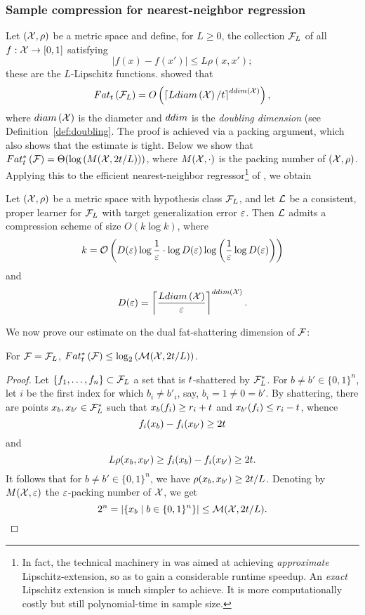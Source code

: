 \documentclass[12pt,a4paper,oneside,onecolumn]{book}
\begin{document}
\subsubsection{Sample compression for nearest-neighbor regression}
\label{sec:NN}
Let $(\mathcal{X},\rho)$ be a metric space
and define, for $L\ge0$, the collection $\mathcal{F}_L$ of all $f:\mathcal{X}\to[0,1]$ satisfying
$$ |f(x)-f(x')|\le L\rho(x,x');$$
these are the $L$-Lipschitz functions.
\citet{GottliebKK17_IEEE} showed that
\begin{eqnarray*}
Fat_{t}\left(\mathcal{F}_L\right) = O\left(  \left\lceil Ldiam\left(\mathcal{X}\right)/t\right\rceil^{ddim(\mathcal{X})} \right),
\end{eqnarray*}
where $diam\left(\mathcal{X}\right)$ is the diameter and $ddim$ is the {\em doubling dimension} (see Definition~\ref{def:doubling}.
The proof is achieved via a packing argument, which also shows that the estimate is tight.
Below we show that
$  Fat^*_{t}\left(\mathcal{F}\right) =
\Theta(\log\left({M}(\mathcal{X},2t/L)\right))$,
where $M(\mathcal{X},\cdot)$ is the packing number of $(\mathcal{X},\rho)$.
Applying this to the efficient
nearest-neighbor regressor\footnote{
  In fact, the technical machinery in
  \citet{DBLP:journals/tit/GottliebKK17}
  was aimed at achieving {\em approximate} Lipschitz-extension,
  so as to gain a considerable runtime speedup. An {\em exact} Lipschitz extension
  is much simpler to achieve. It is more computationally costly but still polynomial-time in sample size.
  }
of
\citet{DBLP:journals/tit/GottliebKK17},
we obtain
\begin{corollary}
  Let $(\mathcal{X},\rho)$ be a metric space with hypothesis class $\mathcal{F}_L$,
  and let $\mathcal{L}$ be a consistent, proper learner for $\mathcal{F}_L$ with target generalization error $\varepsilon$.
Then $\mathcal{L}$ admits a compression scheme of size $O(k\log k)$, where
  \[k = \mathcal{O}\left( D(\varepsilon) \log \frac{1}{\varepsilon} \cdot \log D(\varepsilon)
      \log \left(\frac{1}{\varepsilon} \log D(\varepsilon) \right) \right)\]
and
\[D(\varepsilon) = \left\lceil\frac{Ldiam\left(\mathcal{X}\right)}{\varepsilon}\right\rceil^{ddim(\mathcal{X})}.\]
\end{corollary}


We now prove our estimate on the dual fat-shattering dimension of $\mathcal{F}$:
\begin{lemma}
  For $\mathcal{F}=\mathcal{F}_L$,
  $Fat^*_{t}\left(\mathcal{F}\right)
  \leq \log_2\left(\mathcal{M}(\mathcal{X},2t/L)\right)$.
\end{lemma}
\begin{proof}
  Let $\left\{ f_1,\ldots,f_n \right\}\subset \mathcal{F}_L$ a set that is $t$-shattered by $\mathcal{F}^*_L$.
  For $b \neq b' \in \{0,1\}^n$,
  let $i$ be the first index
  for which $b_i \neq b'_i$,
  say, $b_i = 1\neq0= b'$.
  By shattering,
  there are points $x_b,x_{b'} \in \mathcal{F}^*_L$ such that
  $x_b(f_i) \geq r_i + t$ and
  $x_{b'}(f_i) \leq r_i - t$,
  whence
  \[f_i(x_b) - f_i(x_{b'}) \geq 2t\]
  and
  \[L  \rho(x_b,x_{b'}) \geq  f_i(x_b) - f_i(x_{b'}) \geq 2t.\]
  It follows that for
  $b \neq b' \in \{0,1\}^n$,
we have
$ \rho(x_b,x_{b'}) \geq 2t / L$.
  Denoting by ${M}(\mathcal{X}, \varepsilon)$ the $\varepsilon$-packing number of $\mathcal{X}$,
 we get
  \[2^n = |\{x_b \mid b \in \{0,1\}^n\}| \leq \mathcal{M}(\mathcal{X}, 2t / L). \]
\end{proof}
\end{document}
